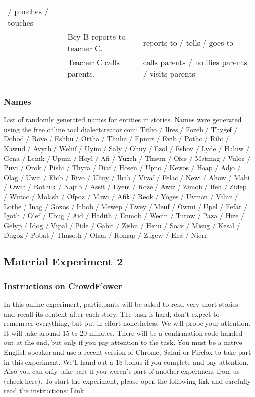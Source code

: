 \begin{itemize}
\begin{longtable}{p{}p{}p{}}
/ punches / touches \\   & Boy B reports to teacher C. & reports to / tells / goes to \\   & Teacher C calls parents. & calls parents / notifies parents / visits parents \\  & & \\
\end{longtable}
\end{itemize}


\subsubsection{Names}
List of randomly generated names for entities in stories. Names were generated using the free online tool dialectcreator.com:\newline
Titho / Ilres / Fozeh / Thygef / Dohod / Rove / Eshbu / Ottha / Thuha / Epnux / Evib / Potho / Ribi / Kawud / Avyth / Wehif / Uyim / Saly / Ohuy / Ezol / Eshov / Lyde / Huluw / Gena / Lenik / Upum / Hoyl / Afi / Yuxeh / Thisun / Ofes / Matmag / Vuloz / Puvi / Orok / Pishi / Thyra / Diaf / Hosen / Upno / Kewos / Hoap / Adjo / Olag / Uwit / Ebib / Rivo / Uhuy / Ihab / Vivaf / Felac / Newi / Ahow / Mabi / Owih / Rothuk / Napib / Assit / Eyem / Roze / Awiz / Zimob / Ifeh / Zidep / Wutoc / Molash / Ofpoz / Mawi / Afik / Reok / Yoges / Uvman / Vilux / Lothe / Inag / Goxos / Itbob / Mewep / Ewey / Meuf / Owmi / Upel / Eefar / Igoth / Olef / Ubug / Aid / Hadith / Enmob / Wecin / Turow / Paza / Hize / Gelyp / Idog / Vipal / Pide / Gabit / Zishu / Henu / Soav / Misug / Kesal / Dugoz / Pobat / Thusoth / Ohan / Romap / Zugew / Ena / Niem

\subsection{Material Experiment 2}
\subsubsection{Instructions on CrowdFlower}
In this online experiment, participants will be asked to read very short stories and recall its content after each story. The task is hard, don't expect to remember everything, but put in effort nonetheless. We will probe your attention. It will take around 15 to 20 minutes. There will be a confirmation code handed out at the end, but only if you pay attention to the task. You must be a native English speaker and use a recent version of Chrome, Safari or Firefox to take part in this experiment. We'll hand out a 1\$ bonus if you complete and pay attention. Also you can only take part if you weren't part of another experiment from us (check here).
To start the experiment, please open the following link and carefully read the instructions: Link

